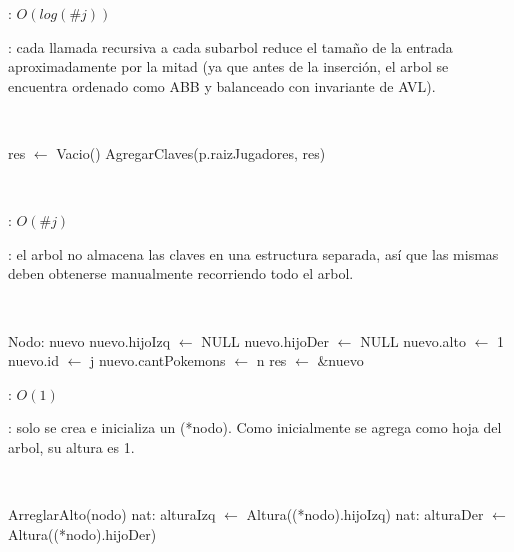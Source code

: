 \begin{Algoritmos}
	\complejidad: $O(log(\#j))$

	\justifcomp: cada llamada recursiva a cada subarbol reduce el tamaño de la entrada aproximadamente por la mitad (ya que antes de la inserción, el arbol se encuentra ordenado como ABB y balanceado con invariante de AVL).

	~

	\begin{algorithm}[H]
		\NoCaptionOfAlgo
		\caption{}
		res $\leftarrow$ Vacio()
		AgregarClaves(p.raizJugadores, res)
	\end{algorithm}

	~

	\begin{algorithm}[H]
		\NoCaptionOfAlgo
		\caption{}
	\end{algorithm}
	
	\complejidad: $O(\#j)$

	\justifcomp: el arbol no almacena las claves en una estructura separada, así que las mismas deben obtenerse manualmente recorriendo todo el arbol.

	~

	\begin{algorithm}[H]
		\NoCaptionOfAlgo
		\caption{}
		Nodo: nuevo
		nuevo.hijoIzq $\leftarrow$ NULL
		nuevo.hijoDer $\leftarrow$ NULL
		nuevo.alto $\leftarrow$ 1
		nuevo.id $\leftarrow$ j
		nuevo.cantPokemons $\leftarrow$ n
		res $\leftarrow$ \&nuevo
	\end{algorithm}
	
	\complejidad: $O(1)$

	\justifcomp: solo se crea e inicializa un (*nodo). Como inicialmente se agrega como hoja del arbol, su altura es 1.

	~

	\begin{algorithm}[H]
		\NoCaptionOfAlgo
		\caption{}
		ArreglarAlto(nodo)
		nat: alturaIzq $\leftarrow$ Altura((*nodo).hijoIzq)
		nat: alturaDer $\leftarrow$ Altura((*nodo).hijoDer)
	\end{algorithm}
	

\end{Algoritmos}
